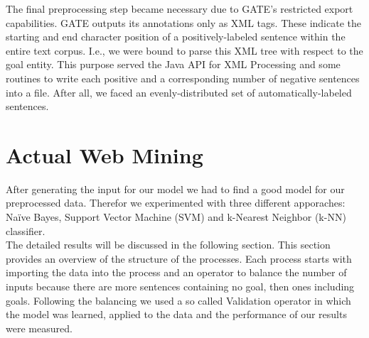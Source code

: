 \documentclass[11pt,titlepage,oneside,openany]{book}
\begin{document}
The final preprocessing step became necessary due to GATE's restricted export capabilities. GATE outputs its annotations only as XML tags. These indicate the starting and end character position of a  positively-labeled sentence within the entire text corpus. I.e., we were bound to parse this XML tree with respect to the goal entity. This purpose served the Java API for XML Processing and some routines to write each positive and a corresponding number of negative sentences into a file. After all, we faced an evenly-distributed set of automatically-labeled sentences.

\section{Actual Web Mining}
\label{sec:webmining}
After generating the input for our model we had to find a good model for our preprocessed data. Therefor we experimented with three different apporaches: Na\"{i}ve Bayes, Support Vector Machine (SVM) and k-Nearest Neighbor (k-NN) classifier. \\ 
The detailed results will be discussed in the following section. This section provides an overview of the structure of the processes. Each process starts with importing the data into the process and an operator to balance the number of inputs because there are more sentences containing no goal, then ones including goals. Following the balancing we used a so called Validation operator in which the model was learned, applied to the data and the performance of our results were measured. \\
\end{document}
